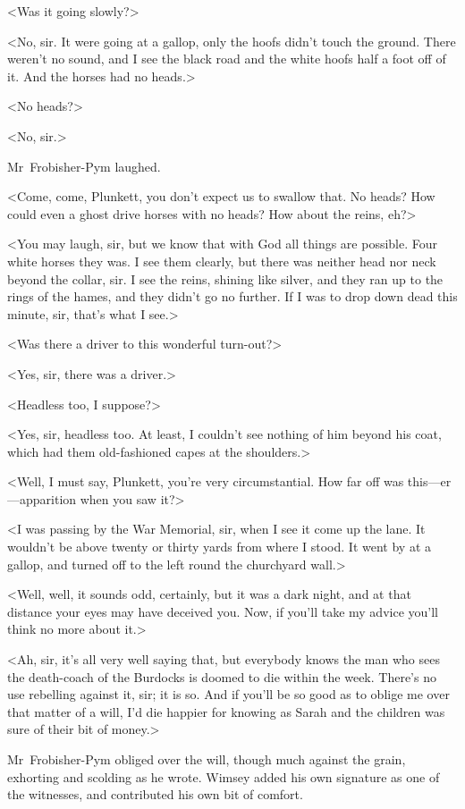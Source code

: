 <Was it going slowly?>

<No, sir. It were going at a gallop, only the hoofs didn't touch the ground. There weren't no sound, and I see the black road and the white hoofs half a foot off of it. And the horses had no heads.>

<No heads?>

<No, sir.>

Mr~Frobisher-Pym laughed.

<Come, come, Plunkett, you don't expect us to swallow that. No heads? How could even a ghost drive horses with no heads? How about the reins, eh?>

<You may laugh, sir, but we know that with God all things are possible. Four white horses they was. I see them clearly, but there was neither head nor neck beyond the collar, sir. I see the reins, shining like silver, and they ran up to the rings of the hames, and they didn't go no further. If I was to drop down dead this minute, sir, that's what I see.>

<Was there a driver to this wonderful turn-out?>

<Yes, sir, there was a driver.>

<Headless too, I suppose?>

<Yes, sir, headless too. At least, I couldn't see nothing of him beyond his coat, which had them old-fashioned capes at the shoulders.>

<Well, I must say, Plunkett, you're very circumstantial. How far off was this—er—apparition when you saw it?>

<I was passing by the War Memorial, sir, when I see it come up the lane. It wouldn't be above twenty or thirty yards from where I stood. It went by at a gallop, and turned off to the left round the churchyard wall.>

<Well, well, it sounds odd, certainly, but it was a dark night, and at that distance your eyes may have deceived you. Now, if you'll take my advice you'll think no more about it.>

<Ah, sir, it's all very well saying that, but everybody knows the man who sees the death-coach of the Burdocks is doomed to die within the week. There's no use rebelling against it, sir; it is so. And if you'll be so good as to oblige me over that matter of a will, I'd die happier for knowing as Sarah and the children was sure of their bit of money.>

Mr~Frobisher-Pym obliged over the will, though much against the grain, exhorting and scolding as he wrote. Wimsey added his own signature as one of the witnesses, and contributed his own bit of comfort.

